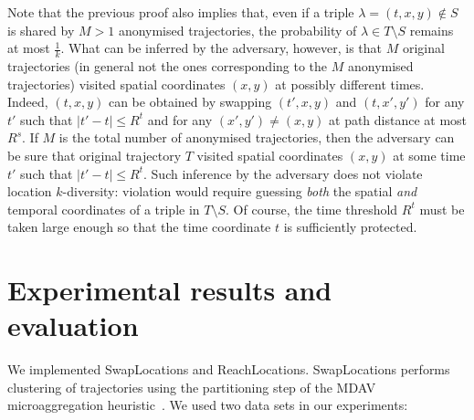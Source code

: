 Note that the previous proof also implies
that, even if a triple $\lambda=(t,x,y) \not\in S$ is shared
by $M>1$ anonymised
trajectories, the probability of $\lambda \in T \setminus S$
remains at most $\frac{1}{k}$.
What can be inferred by the adversary,
however, is that $M$ original trajectories
(in general not the ones corresponding to the $M$ anonymised
trajectories) visited spatial coordinates $(x,y)$
at possibly different times.
Indeed, $(t,x,y)$ can be obtained by swapping $(t',x,y)$
and $(t,x',y')$ for any $t'$ such that $|t'-t| \leq R^t$
and for any $(x',y') \neq (x,y)$ at path distance at most $R^s$.
If $M$ is the total number of anonymised trajectories, then
the adversary can be sure that original
trajectory $T$ visited spatial coordinates
$(x,y)$ at some time $t'$ such that $|t'-t| \leq R^t$.
Such inference by the adversary does
not violate location $k$-diversity: violation
would require guessing {\em both} the spatial {\em and} temporal coordinates
of a triple in $T \setminus S$.
Of course, the time threshold $R^t$ must be taken large enough so that
the time coordinate $t$ is sufficiently protected.

\section{Experimental results and evaluation}

We implemented SwapLocations and ReachLocations. SwapLocations
performs clustering of trajectories using the partitioning step
of the MDAV microaggregation heuristic~\cite{domingo05}.
We used two data sets in our experiments:

